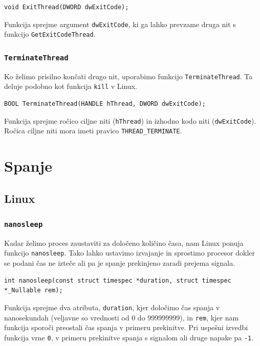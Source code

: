 \documentclass[a4paper,12pt,openright]{book}
\begin{document}
\begin{lstlisting}[style=func]
 void ExitThread(DWORD dwExitCode);
\end{lstlisting}

Funkcija sprejme argument \texttt{dwExitCode}, ki ga lahko prevzame druga nit s funkcijo \texttt{GetExitCodeThread}.

\subsubsection{\texttt{TerminateThread}}

Ko želimo prisilno končati drugo nit, uporabimo funkcijo \texttt{TerminateThread}.
Ta deluje podobno kot funkcija \texttt{kill} v Linux.

\begin{lstlisting}[style=func]
 BOOL TerminateThread(HANDLE hThread, DWORD dwExitCode);
\end{lstlisting}

Funkcija sprejme ročico ciljne niti (\texttt{hThread}) in izhodno kodo niti (\texttt{dwExitCode}).
Ročica ciljne niti mora imeti pravico \texttt{THREAD\_TERMINATE}.

\section{Spanje}

\subsection{Linux}

\subsubsection{\texttt{nanosleep}}

Kadar želimo proces zaustaviti za določeno količino časa, nam Linux ponuja funkcijo \texttt{nanosleep}.
Tako lahko ustavimo izvajanje in sprostimo procesor dokler se podani čas ne izteče ali pa je spanje prekinjeno zaradi prejema signala.

\begin{lstlisting}[style=func]
 int nanosleep(const struct timespec *duration, struct timespec *_Nullable rem);
\end{lstlisting}

Funkcija sprejme dva atributa, \texttt{duration}, kjer določimo čas spanja v nanosekundah (veljavne so vrednosti od 0 do 999999999), in \texttt{rem}, kjer nam funkcija sporoči preostali čas spanja v primeru prekinitve.
Pri uspešni izvedbi funkcija vrne \texttt{0}, v primeru prekinitve spanja s signalom ali druge napake pa \texttt{-1}.
\end{document}
